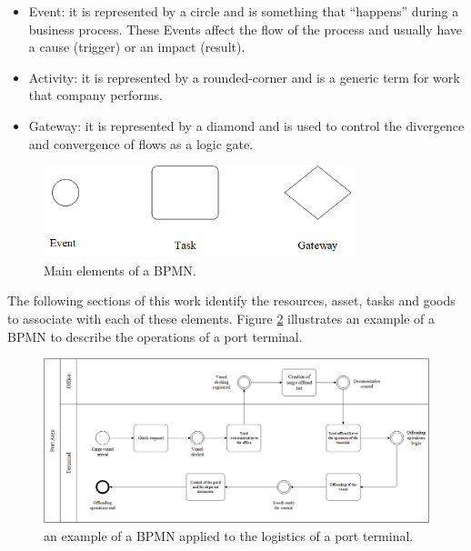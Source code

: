 \begin{itemize}
    \item Event: it is represented by a circle and is something that “happens” during a business process. These Events affect the flow of the process and usually have a cause (trigger) or an impact (result). 
    \item Activity: it is represented by a rounded-corner and is a generic term for work that company performs. 
    \item Gateway: it is represented by a diamond and is used to control the divergence and convergence of flows as a logic gate.

\end{itemize}

\begin{figure}[hbt!]
\centering
\includegraphics[width=0.8\textwidth]{SectionLetsMath/logicalModelling_figures/fig_BPMN.png}
\captionsetup{type=figure}
\caption{Main elements of a BPMN.}
\label{fig_BPMN}
\end{figure}

The following sections of this work identify the resources, asset, tasks and goods to associate with each of these elements. Figure \ref{fig_es_BPMN} illustrates an example of a BPMN to describe the operations of a port terminal.\par 

\begin{landscape}
\thispagestyle{empty}
\begin{figure}[hbt!]
\centering
\includegraphics[width=1.3\textwidth]{SectionLetsMath/logicalModelling_figures/fig_es_BPMN.png}
\captionsetup{type=figure}
\caption{an example of a BPMN applied to the logistics of a port terminal.}
\label{fig_es_BPMN}
\vfill
\end{figure}
\end{landscape}

